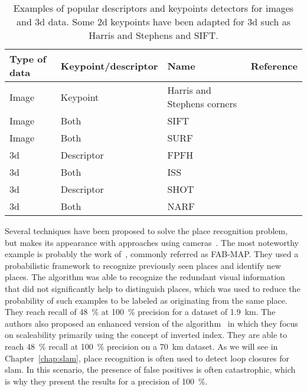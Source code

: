 \begin{table}[htb]
    \centering
    \begin{tabular}{@{}llll@{}}
        \toprule
        \textbf{Type of data}  & \textbf{Keypoint/descriptor} & \textbf{Name}               & \textbf{Reference} \\
        \hline
        Image                  & Keypoint                     & Harris and Stephens corners & \citep{Harris1988}  \\
        Image                  & Both                         & SIFT                        & \citep{Lowe2004}    \\
        Image                  & Both                         & SURF                        & \citep{Bay2006}     \\
        \gls*{3d}              & Descriptor                   & FPFH                        & \citep{Rusu2009}    \\
        \gls*{3d}              & Both                         & ISS                         & \citep{Yu2009}      \\
        \gls*{3d}              & Descriptor                   & SHOT                        & \citep{Tombari2010} \\
        \gls*{3d}              & Both                         & NARF                        & \citep{Steder2011a} \\
        \bottomrule
    \end{tabular}
    \caption[Examples of popular descriptors and keypoints detectors for images and \gls*{3d} data.]{Examples of popular descriptors and keypoints detectors for images and \gls*{3d} data. Some \gls*{2d} keypoints have been adapted for \gls*{3d} such as Harris and Stephens and SIFT.}
    \label{tab:features_examples}
\end{table}

Several techniques have been proposed to solve the place recognition problem, but makes its appearance with approaches using cameras~\citep{Torralba2003, Ulrich2000}. The most noteworthy example is probably the work of~\citet{Cummins2008}, commonly referred as FAB-MAP. They used a probabilistic framework to recognize previously seen places and identify new places. The algorithm was able to recognize the redundant visual information that did not significantly help to distinguish places, which was used to reduce the probability of such examples to be labeled as originating from the same place. They reach recall of \SI{48}{\percent} at \SI{100}{\percent} precision for a dataset of \SI{1.9}{\kilo\meter}. The authors also proposed an enhanced version of the algorithm~\citep{Cummins2011} in which they focus on scaleability primarily using the concept of inverted index. They are able to reach \SI{48}{\percent} recall at \SI{100}{\percent} precision on a \SI{70}{\kilo\meter} dataset. As we will see in Chapter~\ref{chap:slam}, place recognition is often used to detect loop closures for \gls*{slam}. In this scenario, the presence of false positives is often catastrophic, which is why they present the results for a precision of \SI{100}{\percent}.

